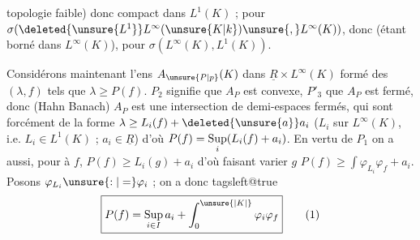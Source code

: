 topologie faible) donc   compact dans $L^1(K)$ ;    pour $\sigma(\deleted{\unsure{L^1}}L^\infty(\unsure{K|k})\unsure{,}L^\infty(K))$, donc (étant borné dans $L^\infty(K)$), pour $\sigma(L^\infty(K),L^1(K))$.

Considérons maintenant l'ens $A_{\unsure{P|p}}(K)$ dans $\underline R\times L^\infty(K)$ formé des $(\lambda,f)$ tels que $\lambda\geq P(f)$. $P_2$ signifie que $A_P$ est convexe, $P'_3$ que $A_P$ est  fermé, donc (Hahn Banach) $A_P$ est une intersection de demi-espaces  fermés,
 qui sont forcément de la forme $\lambda\geq L_i(f)+\deleted{\unsure{a}}a_i$ ($L_i$    sur $L^\infty(K)$, i.e. $L_i\in L^1(K)$ ;  $a_i\in\underline R$) d'où  $P(f)=\mathop{\rm Sup}\limits_i(L_i(f)+a_i)$. En vertu de $P_1$ on a  aussi, pour      à $f$, $P(f)\geq L_i(g)+a_i$ d'où  faisant varier $g$ $P(f)\geq\int\varphi_{L_i}\varphi_f+a_i$. Posons $\varphi_{L_i}\unsure{:|=}\varphi_i$ ; on a donc
\begingroup\csname tagsleft@true\endcsname
\[
\boxed{P(f)=\mathop{\rm Sup}\limits_{i\in I}a_i+\int_0^{\unsure{\lvert K\rvert}}\varphi_i\varphi_f}
\tag*{(1)}
\]
\endgroup

